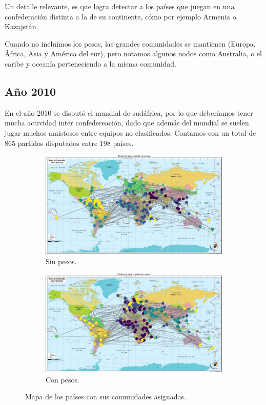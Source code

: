 \documentclass{article}
\begin{document}
Un detalle relevante, es que logra detectar a los países que juegan en una confederación distinta a la 
de su continente, cómo por ejemplo Armenia o Kazajstán.

Cuando no incluímos los pesos, las grandes comunidades se mantienen (Europa, África, Asia y América del sur),
pero notamos algunos nodos como Australia, o el caribe y oceanía perteneciendo a la misma comunidad.

\subsection{Año 2010}

En el año 2010 se disputó el mundial de sudáfrica, por lo que deberíamos tener mucha actividad inter
confedereación, dado que además del mundial se suelen jugar muchos amistosos entre equipos no clasificados.
Contamos con un total de 865 partidos disputados entre 198 países.

\begin{figure}[htb]
    \centering
    \begin{subfigure}{0.49\textwidth}
        \centering
        \includegraphics[width=\linewidth]{images/mapas/mapa_sin_pesos_2010.pdf}
        \caption{Sin pesos.}
        \label{fig:2010_sin_pesos}
    \end{subfigure}
    \begin{subfigure}{0.49\textwidth}
        \centering
        \includegraphics[width=\linewidth]{images/mapas/mapa_con_pesos_2010.pdf}
        \caption{Con pesos.}
        \label{fig:2010_con_pesos}
    \end{subfigure}
    \caption{Mapa de los países con sus comunidades asignadas.}
    \label{fig:mapa_2010}
\end{figure}
\end{document}
